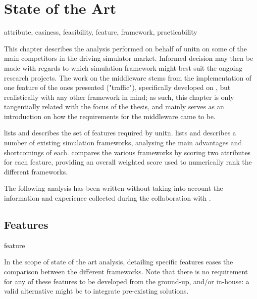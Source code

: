 \chapter{State of the Art}\label{ch:stateoftheart}

\begin{keywords}
	attribute, easiness, feasibility, feature, framework, practicability
\end{keywords}

This chapter describes the analysis performed on behalf of \gls{unitn} on some of the main competitors in the driving simulator market. Informed decision may then be made with regards to which simulation \gls{framework} might best suit the ongoing research projects. The work on the \gls{middleware} stems from the implementation of one feature of the ones presented ("traffic"), specifically developed on , but realistically with any other \gls{framework} in mind; as such, this chapter is only tangentially related with the focus of the thesis, and mainly serves as an introduction on how the requirements for the \gls{middleware} came to be.

 lists and describes the set of \glspl{feature} required by \gls{unitn}.  lists and describes a number of existing simulation \glspl{framework}, analysing the main advantages and shortcomings of each.  compares the various \glspl{framework} by scoring two \glspl{attribute} for each \gls{feature}, providing an overall weighted score used to numerically rank the different \glspl{framework}.

The following analysis has been written without taking into account the information and experience collected during the collaboration with .

\section{Features}\label{sc:stateoftheart:features}

\begin{definition}{feature}
\end{definition}

In the scope of state of the art analysis, detailing specific \glspl{feature} eases the comparison between the different \glspl{framework}. Note that there is no requirement for any of these \glspl{feature} to be developed from the ground-up, and/or in-house: a valid alternative might be to integrate pre-existing solutions.

